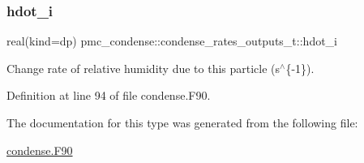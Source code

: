 \mbox{\label{structpmc__condense_1_1condense__rates__outputs__t_a933a8c0491e70d1cdc9f1a5897a5c907}} 
\subsubsection{\texorpdfstring{hdot\+\_\+i}{hdot\_i}}
{\footnotesize\ttfamily real(kind=dp) pmc\+\_\+condense\+::condense\+\_\+rates\+\_\+outputs\+\_\+t\+::hdot\+\_\+i}



Change rate of relative humidity due to this particle (s$^\wedge$\{-\/1\}). 



Definition at line 94 of file condense.\+F90.



The documentation for this type was generated from the following file\+:\begin{DoxyCompactItemize}
\item 
\mbox{\hyperlink{condense_8_f90}{condense.\+F90}}\end{DoxyCompactItemize}
